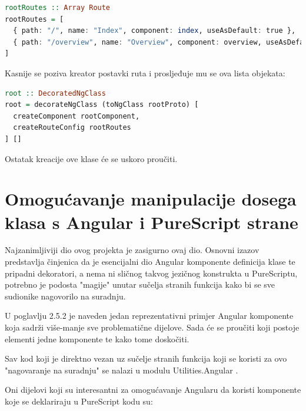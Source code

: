 \documentclass[times, utf8, zavrsni]{fer}
\begin{document}
\begin{lstlisting}[language=PureScript, basicstyle=\small\linespread{0.8}]
rootRoutes :: Array Route
rootRoutes = [
  { path: "/", name: "Index", component: index, useAsDefault: true },
  { path: "/overview", name: "Overview", component: overview, useAsDefault: false }
]
\end{lstlisting}

Kasnije se poziva kreator postavki ruta i prosljeđuje mu se ova lista objekata:

\begin{lstlisting}[language=PureScript, basicstyle=\small\linespread{0.8}]
root :: DecoratedNgClass
root = decorateNgClass (toNgClass rootProto) [
  createComponent rootComponent,
  createRouteConfig rootRoutes
] []
\end{lstlisting}

Ostatak kreacije ove klase će se uskoro proučiti.

\section{Omogućavanje manipulacije dosega klasa s Angular i PureScript strane}
Najzanimljiviji dio ovog projekta je zasigurno ovaj dio. Osnovni izazov predstavlja činjenica da je esencijalni dio Angular komponente definicija klase te pripadni dekoratori, a nema ni sličnog takvog jezičnog konstrukta u PureScriptu, potrebno je podosta "magije" unutar sučelja stranih funkcija kako bi se sve sudionike nagovorilo na suradnju.

U poglavlju 2.5.2 je naveden jedan reprezentativni primjer Angular komponente koja sadrži više-manje sve problematične dijelove. Sada će se proučiti koji postoje elementi jedne komponente te kako tome doskočiti.

Sav kod koji je direktno vezan uz sučelje stranih funkcija koji se koristi za ovo "nagovaranje na suradnju" se nalazi u modulu Utilities.Angular .

Oni dijelovi koji su interesantni za omogućavanje Angularu da koristi komponente koje se deklariraju u PureScript kodu su:
\end{document}
